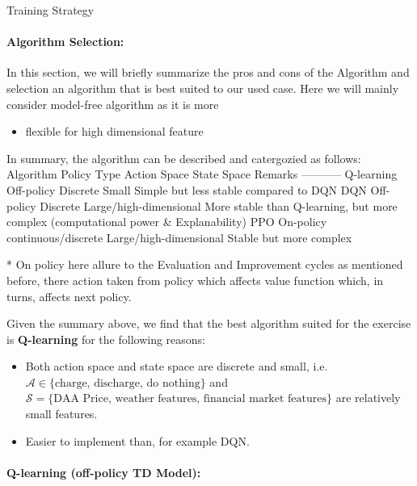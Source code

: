 \documentclass[11pt]{article}
\providecommand{\tightlist}{%
      \setlength{\itemsep}{0pt}\setlength{\parskip}{0pt}}
\begin{document}
    Training Strategy

    \paragraph{\texorpdfstring{{\textbf{Algorithm
Selection}}:}{Algorithm Selection:}}\label{algorithm-selection}

In this section, we will briefly summarize the pros and cons of the
Algorithm and selection an algorithm that is best suited to our used
case. Here we will mainly consider model-free algorithm as it is more

\begin{itemize}
\tightlist
\item
  flexible for high dimensional feature
\end{itemize}

In summary, the algorithm can be described and catergozied as follows:
\textbar{} Algorithm \textbar{} Policy Type\textbar{} Action Space
\textbar{} State Space \textbar{} Remarks \textbar{}
\textbar--\textbar--\textbar--\textbar---\textbar---\textbar{}
\textbar{} Q-learning\textbar{} Off-policy \textbar{} Discrete
\textbar{} Small \textbar{} Simple but less stable compared to
DQN\textbar{} \textbar{} DQN \textbar Off-policy \textbar{} Discrete
\textbar{} Large/high-dimensional \textbar{} More stable than
Q-learning, but more complex (computational power \&
Explanability)\textbar{} \textbar{} PPO \textbar{} On-policy \textbar{}
continuous/discrete \textbar{} Large/high-dimensional \textbar{} Stable
but more complex \textbar{}

* On policy here allure to the Evaluation and Improvement cycles as
mentioned before, there action taken from policy which affects value
function which, in turns, affects next policy.

Given the summary above, we find that the best algorithm suited for the
exercise is {\textbf{Q-learning}} for the following reasons:

\begin{itemize}
\item
  Both action space and state space are discrete and small,
  i.e.~\(\mathcal{A} \in \{\text{charge, discharge, do nothing} \}\) and
  \(\mathcal{S} = \{ \text{DAA Price, weather features, financial market features} \}\)
  are relatively small features.
\item
  Easier to implement than, for example DQN.
\end{itemize}

    \paragraph{\texorpdfstring{{\textbf{Q-learning}} (off-policy TD
Model):}{Q-learning (off-policy TD Model):}}\label{q-learning-off-policy-td-model}
\end{document}
